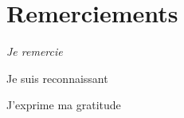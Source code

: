 \chapter*{\huge Remerciements}

\begin{center}
\it \Large
    Je remercie
    
    Je suis reconnaissant
    
    J'exprime ma gratitude
\end{center}